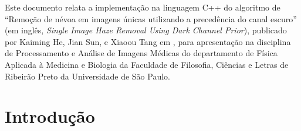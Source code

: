 \documentclass[12pt,openany, oneside,
 article, 
 a4paper, hyphens, english, brazil]{abntex2}
\begin{document}
	\frenchspacing 


\imprimirfolhaderosto

		\newpage
		
		
	\setcounter{page}{1}
	
	\textual
	\pagestyle{plain}
	
\begin{resumo}
	Este documento relata a implementação na linguagem C++ do algoritmo de ``Remoção de névoa em imagens únicas utilizando a precedência do canal escuro'' (em inglês, \textit{Single Image Haze Removal Using Dark Channel Prior}), publicado por Kaiming He, Jian Sun, e Xiaoou Tang em \cite{HazeRemoval}, para apresentação na disciplina de Processamento e Análise de Imagens Médicas do departamento de Física Aplicada à Medicina e Biologia da Faculdade de Filosofia, Ciências e Letras de Ribeirão Preto da Universidade de São Paulo.
	
\end{resumo}	
	
\section{Introdução}
\setlength{\ABNTEXcitacaorecuo}{0.9cm}
\end{document}
